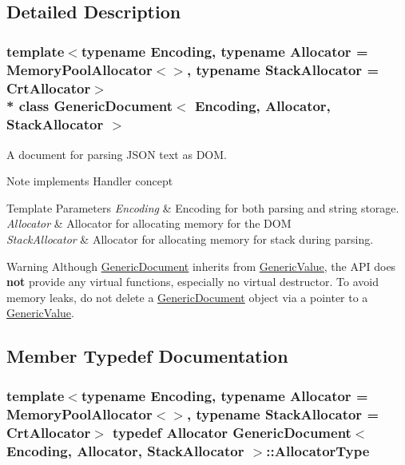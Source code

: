 \subsection{Detailed Description}
\subsubsection*{template$<$typename Encoding, typename Allocator = Memory\+Pool\+Allocator$<$$>$, typename Stack\+Allocator = Crt\+Allocator$>$\\*
class Generic\+Document$<$ Encoding, Allocator, Stack\+Allocator $>$}

A document for parsing J\+S\+ON text as D\+OM. 

\begin{DoxyNote}{Note}
implements Handler concept 
\end{DoxyNote}

\begin{DoxyTemplParams}{Template Parameters}
{\em Encoding} & Encoding for both parsing and string storage. \\
\hline
{\em Allocator} & Allocator for allocating memory for the D\+OM \\
\hline
{\em Stack\+Allocator} & Allocator for allocating memory for stack during parsing. \\
\hline
\end{DoxyTemplParams}
\begin{DoxyWarning}{Warning}
Although \hyperlink{classGenericDocument}{Generic\+Document} inherits from \hyperlink{classGenericValue}{Generic\+Value}, the A\+PI does {\bfseries not} provide any virtual functions, especially no virtual destructor. To avoid memory leaks, do not {\ttfamily delete} a \hyperlink{classGenericDocument}{Generic\+Document} object via a pointer to a \hyperlink{classGenericValue}{Generic\+Value}. 
\end{DoxyWarning}


\subsection{Member Typedef Documentation}
\subsubsection[{\texorpdfstring{Allocator\+Type}{AllocatorType}}]{\setlength{\rightskip}{0pt plus 5cm}template$<$typename Encoding, typename Allocator = Memory\+Pool\+Allocator$<$$>$, typename Stack\+Allocator = Crt\+Allocator$>$ typedef Allocator {\bf Generic\+Document}$<$ Encoding, Allocator, Stack\+Allocator $>$\+::{\bf Allocator\+Type}}\hypertarget{classGenericDocument_a35155b912da66ced38d22e2551364c57}{}\label{classGenericDocument_a35155b912da66ced38d22e2551364c57}


